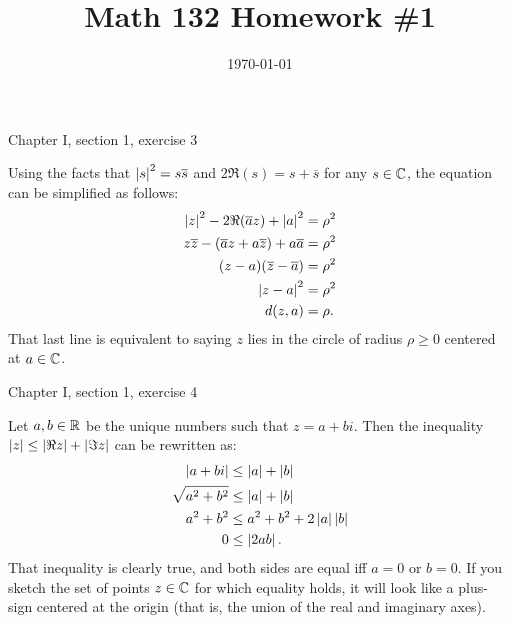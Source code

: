 \documentclass{article}
\date{\today}
\title{Math 132 Homework \#1}
\begin{document}
\maketitle

\begin{prob}
    Chapter I, section 1, exercise 3
\end{prob}
Using the facts that $\left\lvert s \right\rvert^2 = s \overline{s}$ and $2 \Re(s) = s + \overline{s}$ for any $s \in \mathbb{C}$, the equation can be simplified as follows:
\begin{align*}
    \left\lvert z \right\rvert^2 -2 \Re(\overline{a} z) + \left\lvert a \right\rvert^2 &= \rho^2 \\
    z \overline{z} - (\overline{a} z + a \overline{z}) + a \overline{a} &= \rho^2 \\
    (z - a)(\overline{z} - \overline{a}) &= \rho^2 \\
    \left\lvert z-a \right\rvert^2 &= \rho^2 \\
    d(z, a) &= \rho.
\end{align*}
That last line is equivalent to saying $z$ lies in the circle of radius $\rho \geq 0$ centered at $a \in \mathbb{C}$.

\bigskip
\par
\begin{prob}
    Chapter I, section 1, exercise 4
\end{prob}
Let $a, b \in \mathbb{R}$ be the unique numbers such that $z = a+bi$. Then the inequality $\left\lvert z \right\rvert \leq \left\lvert \Re{z} \right\rvert + \left\lvert \Im{z} \right\rvert$ can be rewritten as:
\begin{align*}
    \left\lvert a+bi \right\rvert &\leq \left\lvert a \right\rvert + \left\lvert b \right\rvert \\
    \sqrt{a^2+b^2} &\leq \left\lvert a \right\rvert + \left\lvert b \right\rvert \\
    a^2 + b^2 &\leq a^2 + b^2 + 2 \left\lvert a \right\rvert \left\lvert b \right\rvert \\
    0 &\leq \left\lvert 2 a b \right\rvert.
\end{align*}
That inequality is clearly true, and both sides are equal iff $a=0$ or $b=0$. If you sketch the set of points $z \in \mathbb{C}$ for which equality holds, it will look like a plus-sign centered at the origin (that is, the union of the real and imaginary axes).
\end{document}
